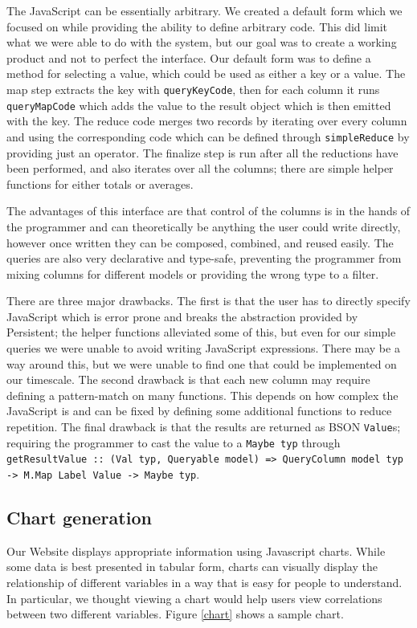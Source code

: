 \documentclass[letterpaper,twocolumn,9pt]{article}
\newcommand{\code}[1]{\texttt{#1}}
\begin{document}
The JavaScript can be essentially arbitrary.  We created a default form which we focused on while providing the ability to define arbitrary code.  This did limit what we were able to do with the system, but our goal was to create a working product and not to perfect the interface.  Our default form was to define a method for selecting a value, which could be used as either a key or a value.  The map step extracts the key with \code{queryKeyCode}, then for each column it runs \code{queryMapCode} which adds the value to the result object which is then emitted with the key.  The reduce code merges two records by iterating over every column and using the corresponding code which can be defined through \code{simpleReduce} by providing just an operator.  The finalize step is run after all the reductions have been performed, and also iterates over all the columns; there are simple helper functions for either totals or averages.

The advantages of this interface are that control of the columns is in the hands of the programmer and can theoretically be anything the user could write directly, however once written they can be composed, combined, and reused easily.  The queries are also very declarative and type-safe, preventing the programmer from mixing columns for different models or providing the wrong type to a filter.

There are three major drawbacks.  The first is that the user has to directly specify JavaScript which is error prone and breaks the abstraction provided by Persistent; the helper functions alleviated some of this, but even for our simple queries we were unable to avoid writing JavaScript expressions.  There may be a way around this, but we were unable to find one that could be implemented on our timescale.  The second drawback is that each new column may require defining a pattern-match on many functions.  This depends on how complex the JavaScript is and can be fixed by defining some additional functions to reduce repetition.  The final drawback is that the results are returned as BSON \code{Value}s; requiring the programmer to cast the value to a \code{Maybe typ} through \code{getResultValue :: (Val typ, Queryable model) => QueryColumn model typ -> M.Map Label Value -> Maybe typ}.

\subsection{Chart generation}

Our Website displays appropriate information using Javascript charts. While some data is best presented in tabular form, charts can visually display the relationship of different variables in a way that is easy for people to understand. In particular, we thought viewing a chart would help users view correlations between two different variables. Figure \ref{chart} shows a sample chart.
\end{document}
